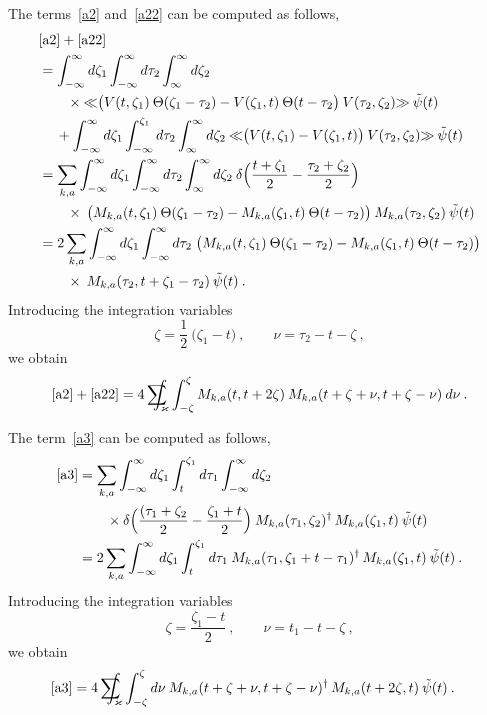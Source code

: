 \documentclass[reqno,11pt]{amsart}
\numberwithin{equation}{section}
\newcommand{\bbra}{\mathopen{\ll}}
\newcommand{\kket}{\mathclose{\gg}}
\newcommand{\1}{\mathds{1}}
\newcommand{\sint}{\sum  \!\!\!\!\!\!\! \int }
\begin{document}
{The terms~\eqref{a2} and~\eqref{a22} can be computed as follows,
\begin{align*}
&\eqref{a2}+\eqref{a22} \\
&= \int_{-\infty}^\infty d\zeta_1 \int_{-\infty}^\infty d\tau_2 \int_{\infty}^\infty
d\zeta_2 \\
&\qquad \times \bbra \big( V(t,\zeta_1) \: \Theta(\zeta_1-\tau_2)- V(\zeta_1, t) 
 \: \Theta(t-\tau_2\big)\:V(\tau_2, \zeta_2) \kket \:\tilde{\psi}(t) \\
&\quad\:+ \int_{-\infty}^\infty d\zeta_1 \int_{-\infty}^{\zeta_1} d\tau_2 \int_{\infty}^\infty
d\zeta_2\: \bbra \big( V(t,\zeta_1) - V(\zeta_1, t) \big)\:V(\tau_2, \zeta_2) \kket \:\tilde{\psi}(t) \\
&= \sum_{k,a} \int_{-\infty}^\infty d\zeta_1 \int_{-\infty}^\infty d\tau_2 \int_{\infty}^\infty
d\zeta_2 \: \delta \Big( \frac{t+\zeta_1}{2} - \frac{\tau_2+\zeta_2}{2} \Big) \\
&\qquad \times 
\: \big( M_{k,a}(t,\zeta_1)\: \Theta(\zeta_1-\tau_2) - M_{k,a}(\zeta_1, t) 
\: \Theta(t-\tau_2)\big)\:M_{k,a}(\tau_2, \zeta_2)\:\tilde{\psi}(t) \\
&= 2 \sum_{k,a} \int_{-\infty}^\infty d\zeta_1 \int_{-\infty}^\infty d\tau_2 \;
\big( M_{k,a}(t,\zeta_1) \: \Theta(\zeta_1-\tau_2)- M_{k,a}(\zeta_1, t) \: \Theta(t-\tau_2)\big) \\
&\qquad \times \:M_{k,a}(\tau_2, 
t+\zeta_1-\tau_2)\:\tilde{\psi}(t) \:.
\end{align*}
Introducing the integration variables
\[ \zeta = \frac{1}{2} \:\big( \zeta_1 - t \big)\:,\qquad \nu = \tau_2 - t- \zeta \:, \]
we obtain
\[ \eqref{a2}+\eqref{a22}
= 4 \sint_\varkappa \int_{-\zeta}^\zeta M_{k,a}(t, t+2 \zeta) \:
M_{k,a}(t+\zeta+\nu, t +\zeta- \nu)\: d\nu \:. \]


The term~\eqref{a3} can be computed as follows,
\begin{align*}
\eqref{a3}
&= \sum_{k,a}
\int_{-\infty}^\infty d\zeta_1 \int_t^{\zeta_1} d\tau_1 \int_{-\infty}^\infty d\zeta_2 \\
&\qquad \times
\delta \Big( \frac{(\tau_1+\zeta_2}{2} - \frac{\zeta_1+t}{2} \Big)\:
M_{k,a}(\tau_1, \zeta_2)^\dagger\,M_{k,a}(\zeta_1,t) \:\tilde{\psi}(t) \\
&= 2 \sum_{k,a}
\int_{-\infty}^\infty d\zeta_1 \int_t^{\zeta_1} d\tau_1\:
M_{k,a}(\tau_1, \zeta_1+t-\tau_1)^\dagger\,M_{k,a}(\zeta_1,t) \:\tilde{\psi}(t) \:.
\end{align*}
Introducing the integration variables
\[ \zeta = \frac{\zeta_1-t}{2} \:,\qquad \nu = t_1-t-\zeta\:, \]
we obtain
\begin{align*}
\eqref{a3} &= 4 \sint_\varkappa
\int_{-\zeta}^\zeta d\nu\:
M_{k,a}(t+\zeta+\nu ,t+\zeta-\nu)^\dagger\,M_{k,a}(t+2 \zeta,t) \:\tilde{\psi}(t) \:.
\end{align*}

}
\end{document}
